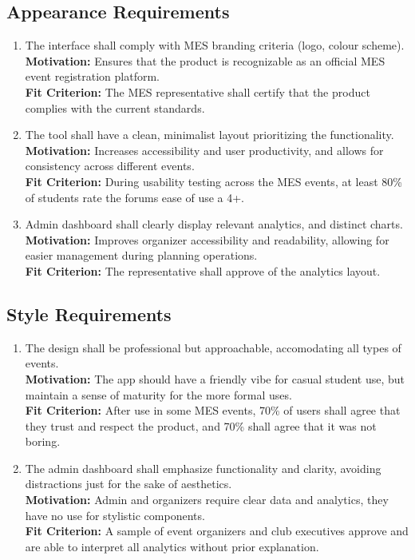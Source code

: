 \documentclass[12pt]{article}
\begin{document}
\subsection{Appearance Requirements}
\begin{enumerate}[label=LFR-AP.\arabic*, wide=0pt, leftmargin=*]
  \item The interface shall comply with MES branding criteria (logo, colour scheme).\\[2mm]
    {\bf Motivation:} Ensures that the product is recognizable as an official MES event registration platform.\\
    {\bf Fit Criterion:} The MES representative shall certify that the product complies with the current standards.
  \item The tool shall have a clean, minimalist layout prioritizing the functionality.\\[2mm]
    {\bf Motivation:} Increases accessibility and user productivity, and allows for consistency across different events.\\
    {\bf Fit Criterion:} During usability testing across the MES events, at least 80\% of students rate the forums ease of use a 4+.
  \item Admin dashboard shall clearly display relevant analytics, and distinct charts.\\[2mm]
    {\bf Motivation:} Improves organizer accessibility and readability, allowing for easier management during planning operations.\\
    {\bf Fit Criterion:} The representative shall approve of the analytics layout.
\end{enumerate}

\subsection{Style Requirements}
\begin{enumerate}[label=LFR-S.\arabic*, wide=0pt, leftmargin=*]
  \item The design shall be professional but approachable, accomodating all types of events.\\[2mm]
    {\bf Motivation:} The app should have a friendly vibe for casual student use, but maintain a sense of maturity for the more formal uses.\\
    {\bf Fit Criterion:} After use in some MES events, 70\% of users shall agree that they trust and respect the product, and 70\% shall agree that it was not boring.
  \item The admin dashboard shall emphasize functionality and clarity, avoiding distractions just for the sake of aesthetics.\\[2mm]
    {\bf Motivation:} Admin and organizers require clear data and analytics, they have no use for stylistic components.\\
    {\bf Fit Criterion:} A sample of event organizers and club executives approve and are able to interpret all analytics without prior explanation.
\end{enumerate}
\end{document}
